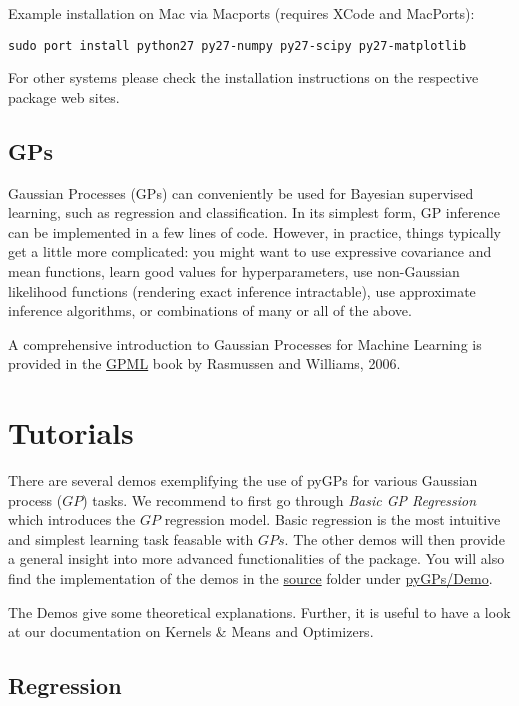 \documentclass[letterpaper,10pt,english]{sphinxmanual}
\begin{document}
Example installation on Mac via Macports (requires XCode and MacPorts):

\begin{Verbatim}[commandchars=\\\{\}]
sudo port install python27 py27-numpy py27-scipy py27-matplotlib
\end{Verbatim}

For other systems please check the installation instructions on the respective package web sites.


\subsection{GPs}
\label{Theory::doc}\label{Theory:gps}
Gaussian Processes (GPs) can conveniently be used for Bayesian supervised learning, such as regression and classification.
In its simplest form, GP inference can be implemented in a few lines of code. However, in practice, things typically
get a little more complicated: you might want to use expressive covariance and mean functions, learn good values
for hyperparameters, use non-Gaussian likelihood functions (rendering exact inference intractable), use approximate inference
algorithms, or combinations of many or all of the above.

A comprehensive introduction to Gaussian Processes for Machine Learning is provided in the \href{http://www.gaussianprocess.org/gpml}{GPML} book by Rasmussen and Williams, 2006.


\section{Tutorials}
\label{index:tutorials}\label{index:gpml}
There are several demos exemplifying the use of pyGPs for various Gaussian process ($GP$) tasks.
We recommend to first go through \emph{Basic GP Regression} which introduces the $GP$ regression model.
Basic regression is the most intuitive and simplest learning task feasable with $GPs$.
The other demos will then provide a general insight into more advanced functionalities of the package.
You will also find the implementation of the demos in the \href{https://github.com/marionmari/pyGPs}{source} folder under \href{https://github.com/marionmari/pyGPs/tree/master/pyGPs/Demo}{pyGPs/Demo}.

The Demos give some theoretical explanations. Further, it is useful to have a look at our documentation on Kernels \& Means and Optimizers.


\subsection{Regression}
\label{Examples:source}\label{Examples::doc}\label{Examples:regression}
\end{document}
